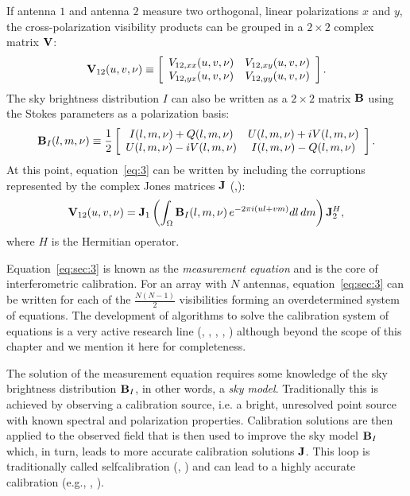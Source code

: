 If antenna $1$ and antenna $2$ measure two orthogonal, linear polarizations $x$ and $y$, the cross-polarization visibility products can be grouped in a $2 \times 2$ complex matrix ${\bf V}$:
\begin{equation}
    {\bf V}_{12} (u,v,\nu) \equiv 
    \left[ 
    \begin{array}{cc}
    V_{12,xx} (u,v,\nu) & V_{12,xy} (u,v,\nu) \\
    V_{12,yx} (u,v,\nu) & V_{12,yy} (u,v,\nu) \\
    \end{array}
    \right].   
\label{eq:sec:1}
\end{equation} 
The sky brightness distribution $I$ can also be written as a $2 \times 2$ matrix ${\bf B}$ using the Stokes parameters as a polarization basis:
\begin{equation}
    {\bf B}_I (l,m,\nu) \equiv 
    \frac{1}{2} \left[
    \begin{array}{cc}
    I (l,m,\nu) + Q (l,m,\nu) & U (l,m,\nu) + iV (l,m,\nu) \\
    U (l,m,\nu) - iV (l,m,\nu) & I (l,m,\nu) - Q (l,m,\nu) \\
    \end{array}
    \right].   
\label{eq:sec:2}
\end{equation} 
At this point, equation~\ref{eq:3} can be written by including the corruptions represented by the complex Jones matrices ${\bf J}$ (\cite{hamaker96},\cite{smirnov11}):
\begin{equation}
{\bf V}_{12} (u,v,\nu) = {\bf J}_1 \left( \int_\Omega {\bf B}_I (l, m, \nu) \, e^{-2 \pi i (ul + vm)} dl \, dm  \right) {\bf J}_2^H,
\label{eq:sec:3}
\end{equation}
where $H$ is the Hermitian operator.
 
Equation~\ref{eq:sec:3} is known as the {\it measurement equation} and is the core of interferometric calibration. For an array with $N$ antennas, equation~\ref{eq:sec:3} can be written for each of the $\frac{N (N - 1)}{2}$ visibilities forming an overdetermined system of equations. The development of  algorithms to solve the calibration system of equations is a very active research line (\cite{mitchell08}, \cite{kazemi11}, \cite{tasse14}, \cite{yatawatta15}, \cite{smirnov15}) although beyond the scope of this chapter and we mention it here for completeness.

The solution of the measurement equation requires some knowledge of the sky brightness distribution ${\bf B}_I$, in other words, a {\it sky model}. Traditionally this is achieved by observing a calibration source, i.e. a bright, unresolved point source with known spectral and polarization properties. Calibration solutions are then applied to the observed field that is then used to improve the sky model ${\bf B}_I$ which, in turn, leads to more accurate calibration solutions ${\bf J}$. This loop is traditionally called selfcalibration (\cite{cornwell81}, \cite{pearson84}) and can lead to a highly accurate calibration (e.g., \cite{bernardi10}, \cite{smirnov11b}).

